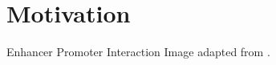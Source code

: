 \section{Motivation}


\begin{frame}[c]{Enhancer Promoter Interaction}
    \only<-1>{\texttt{[image: Enhancer\_Nucleotide\_Sequence]}}
    Image adapted from \cite{figenhancers}.

\end{frame}

